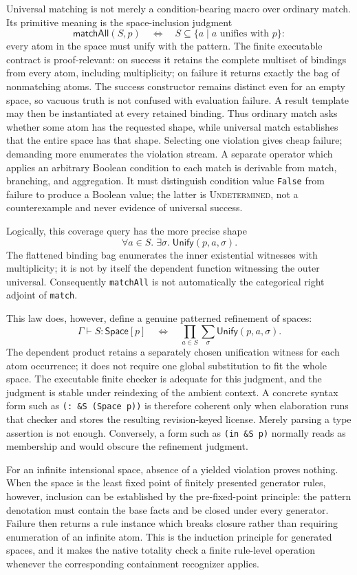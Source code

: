 \documentclass[11pt]{article}
\newcommand{\code}[1]{\texttt{#1}}
\begin{document}
Universal matching is not merely a condition-bearing macro over ordinary match.
Its primitive meaning is the space-inclusion judgment
\[
  \mathsf{matchAll}(S,p) \quad\Longleftrightarrow\quad
  S\subseteq\{a\mid a\text{ unifies with }p\}:
\]
every atom in the space must unify with the pattern.  The finite executable
contract is proof-relevant: on success it retains the complete multiset of
bindings from every atom, including multiplicity; on failure it returns exactly
the bag of nonmatching atoms.  The success constructor remains distinct even for
an empty space, so vacuous truth is not confused with evaluation failure.  A
result template may then be instantiated at every retained binding.  Thus
ordinary match
asks whether some atom has the requested shape, while universal match establishes
that the entire space has that shape.  Selecting one violation gives cheap
failure; demanding more enumerates the violation stream.  A separate operator
which applies an arbitrary Boolean condition to each match is derivable from
match, branching, and aggregation.  It must distinguish condition value
\code{False} from failure to produce a Boolean value; the latter is
\textsc{Undetermined}, not a counterexample and never evidence of universal
success.

Logically, this coverage query has the more precise shape
\[
  \forall a\in S.\;\exists\sigma.\;\mathsf{Unify}(p,a,\sigma).
\]
The flattened binding bag enumerates the inner existential witnesses with
multiplicity; it is not by itself the dependent function witnessing the outer
universal.  Consequently \code{matchAll} is not automatically the categorical
right adjoint of \code{match}.

This law does, however, define a genuine patterned refinement of spaces:
\[
  \Gamma\vdash S:\mathsf{Space}[p]
  \quad\Longleftrightarrow\quad
  \prod_{a\in S}\sum_{\sigma}\mathsf{Unify}(p,a,\sigma).
\]
The dependent product retains a separately chosen unification witness for each
atom occurrence; it does not require one global substitution to fit the whole
space.  The executable finite checker is adequate for this judgment, and the
judgment is stable under reindexing of the ambient context.  A concrete syntax form such
as \code{(: \&S (Space p))} is therefore coherent only when elaboration runs
that checker and stores the resulting revision-keyed license.  Merely parsing a
type assertion is not enough.  Conversely, a form such as \code{(in \&S p)}
normally reads as membership and would obscure the refinement judgment.

For an infinite intensional space, absence of a yielded violation proves
nothing.  When the space is the least fixed point of finitely presented generator
rules, however, inclusion can be established by the pre-fixed-point principle:
the pattern denotation must contain the base facts and be closed under every
generator.  Failure then returns a rule instance which breaks closure rather
than requiring enumeration of an infinite atom.  This is the induction
principle for generated spaces, and it makes the native totality check a finite
rule-level operation whenever the corresponding containment recognizer applies.
\end{document}

